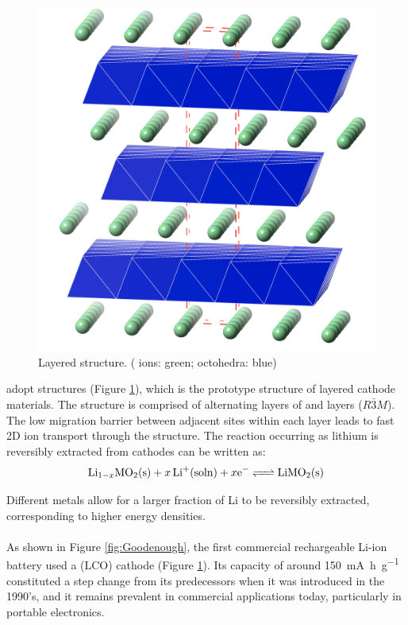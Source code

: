 \subsection{}
\begin{figure}
\centering
\includegraphics[height=0.6\linewidth]{figures/structures/LiCoO2}
\caption[Layered  structure]{Layered  structure. ( ions: green;  octohedra: blue)\\ }
\label{fig:LCO}
\end{figure}
 adopt  structures (Figure \ref{fig:LCO}), which is the prototype structure of  layered cathode materials.
The structure is comprised of alternating layers of \ce{[CoO2]-} and  layers ($R\bar{3}M$).\cite{Islam2014}
The low migration barrier between adjacent  sites within each layer leads to fast 2D ion transport through the structure.\cite{Ellis2010a}
The reaction occurring as lithium is reversibly extracted from  cathodes can be written as:\cite{Islam2014}
\begin{equation}
\ce{Li_{1-x}MO2(s) +$x$Li+(soln) +$x$e- <=> LiMO2(s)}
\end{equation}

Different metals allow for a larger fraction of Li to be reversibly extracted, corresponding to higher energy densities.

\paragraph{}
As shown in Figure \ref{fig:Goodenough}, the first commercial rechargeable Li-ion battery used a  (LCO) cathode (Figure \ref{fig:LCO}).
Its capacity of around \SI{150}{\milli\ampere\hour\per\gram} constituted a step change from its predecessors when it was introduced in the 1990's, and it remains prevalent in commercial applications today, particularly in portable electronics.\cite{Goodenough2013}

